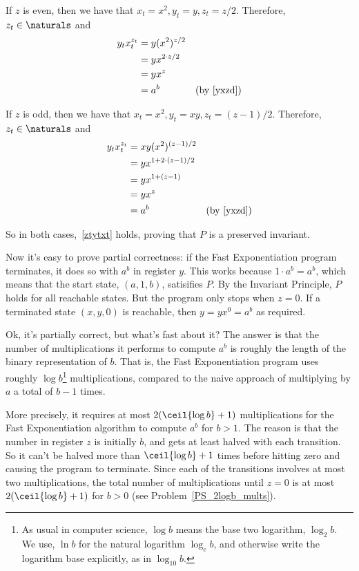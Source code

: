 If $z$ is even, then we have that $x_t = x^2, y_t = y, z_t = z/2$.
Therefore, $z_t \in \naturals$ and
\begin{align*}
y_tx_t^{z_t} & = y(x^2)^{z/2}\\
           & = yx^{2\cdot z/2}\\
           & = yx^z\\
           & = a^b & \mbox{(by~\eqref{yxzd})}
\end{align*}

If $z$ is odd, then we have that $x_t = x^2, y_t = xy, z_t = (z-1)/2$.
Therefore, $z_t \in \naturals$ and
\begin{align*}
y_tx_t^{z_t} & = xy(x^2)^{(z-1)/2}\\
& = yx^{1+2 \cdot (z-1)/2}\\
& = yx^{1+(z-1)}\\
& = yx^z\\
& = a^b & \mbox{(by~\eqref{yxzd})}
\end{align*}

So in both cases,~\eqref{ztytxt} holds, proving that $P$ is a preserved
invariant.

Now it's easy to prove partial correctness: if the Fast
Exponentiation program terminates, it does so with $a^b$ in register
$y$.  This works because $1\cdot a^b = a^b$, which means
that the start state, $(a,1,b)$, satisifies $P$.  By the Invariant
Principle, $P$ holds for all reachable states.  But the program
only stops when $z = 0$.  If a terminated state $(x,y,0)$ is
reachable, then $y = yx^0 = a^b$ as required.

Ok, it's partially correct, but what's fast about it?  The answer is
that the number of multiplications it performs to compute $a^b$ is
roughly the length of the binary representation of $b$.  That is, the
Fast Exponentiation program uses roughly $\log b$\footnote{As usual in
  computer science, $\log b$ means the base two logarithm, $\log_2 b$.
  We use, $\ln b$ for the natural logarithm $\log_e b$, and otherwise
  write the logarithm base explicitly, as in $\log_{10} b$.}
 multiplications,
compared to the naive approach of multiplying by $a$ a total of $b-1$
times.

More precisely, it requires at most $2 (\ceil{\log b}+1)$
multiplications for the Fast Exponentiation algorithm to compute $a^b$ for
$b>1$.  The reason is that the number in register $z$ is initially $b$,
and gets at least halved with each transition.  So it can't be halved more
than $\ceil{\log b}+1$ times before hitting zero and causing the
program to terminate.  \iffalse The $(b+1)$ comes in because for $b =
2^p$, a power of two, it takes $(p+1)$ halves to get zero.  \fi Since each
of the transitions involves at most two multiplications, the total number
of multiplications until $z=0$ is at most $2(\ceil{\log b}+1)$ for $b
> 0$ (see Problem~\ref{PS_2logb_mults}).

